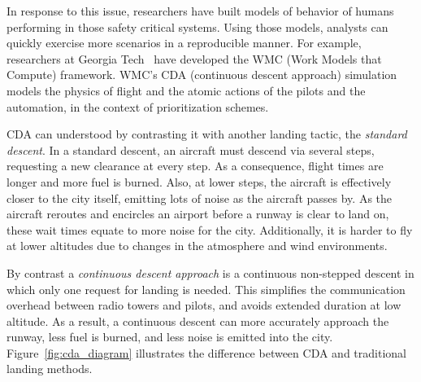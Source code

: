 \documentclass[journal]{IEEEtran}
\newcommand{\fig}[1]{Figure~\ref{fig:#1}}
\begin{document}
In response to this issue, researchers have built models of behavior of humans performing in those safety critical systems.  
Using those models, analysts can quickly exercise more scenarios in a reproducible manner.  
For example, researchers at Georgia Tech~\cite{Kim2011,Pritchett2011,Feigh2012,Kim2013,Pritchett2014,Feigh2014} have developed the WMC (Work Models that Compute) framework.  
WMC's CDA (continuous descent approach) simulation models the physics of flight and the atomic actions of the pilots and the automation, in the context of prioritization schemes.


CDA can understood by contrasting it with another landing tactic, the {\em standard descent}.  
In a standard descent, an aircraft must descend via several steps, requesting a new clearance at every step.  
As a consequence, flight times are longer and more fuel is burned.  
Also, at lower steps, the aircraft is effectively closer to the city itself, emitting lots of noise as the aircraft passes by.
As the aircraft reroutes and encircles an airport before a runway is clear to land on, these wait times equate to more noise for the city.
Additionally, it is harder to fly at lower altitudes due to changes in the atmosphere and wind environments.

By contrast a {\em continuous descent approach} is a continuous non-stepped descent in which only one request for landing is needed.  
This simplifies the communication overhead between radio towers and pilots, and avoids extended duration at low altitude.  
As a result, a continuous descent can more accurately approach the runway, less fuel is burned, and less noise is emitted into the city.  
\fig{cda_diagram} illustrates the difference between CDA and traditional landing methods.
\end{document}
